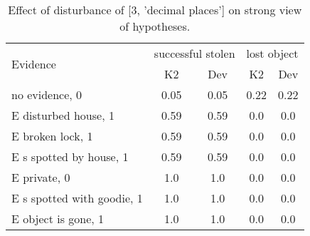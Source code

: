 \begin{table}\begin{tabular}{l|cc|cc}\toprule\multirow{2}{*}{Evidence} & \multicolumn{2}{c}{successful stolen}& \multicolumn{2}{c}{lost object}\\& {K2} & {Dev}& {K2} & {Dev}\\\midrule
no evidence, 0 & 0.05&0.05&0.22&0.22\\E disturbed house, 1 & 0.59&0.59&0.0&0.0\\E broken lock, 1 & 0.59&0.59&0.0&0.0\\E s spotted by house, 1 & 0.59&0.59&0.0&0.0\\E private, 0 & 1.0&1.0&0.0&0.0\\E s spotted with goodie, 1 & 1.0&1.0&0.0&0.0\\E object is gone, 1 & 1.0&1.0&0.0&0.0\\\bottomrule\end{tabular}\caption{Effect of disturbance of [3, 'decimal places'] on strong view of hypotheses.}\end{table}